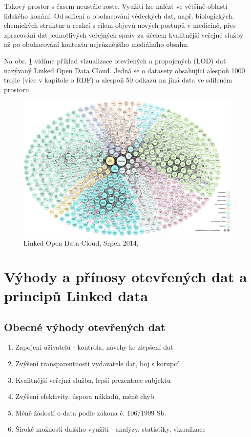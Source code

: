 Takový prostor s časem neustále roste. Využití lze nalézt ve většině oblastí lidského konání. Od sdílení a obohacování vědeckých dat, např. biologických, chemických struktur a reakcí s cílem objevů nových postupů v medicíně, přes zpracování dat jednotlivých veřejných správ za účelem kvalitnější veřejné služby až po obohacování kontextu nejrůznějšího mediálního obsahu. 

Na obr. \ref{obr:lodcloud} vidíme příklad vizualizace otevřených a propojených (LOD) dat nazývaný Linked Open Data Cloud. Jedná se o datasety obsahující alespoň 1000 trojic (více v kapitole o RDF) a alespoň 50 odkazů na jiná data ve sdíleném prostoru. 

\newpage

\begin{figure}[h]
\centerline{\includegraphics[width=\textwidth]{img/lodcloud.eps}}
\caption[Linked Open Data Cloud]{Linked Open Data Cloud, Srpen 2014, \cite{cloud}}
\label{obr:lodcloud}
\end{figure}

\section{Výhody a přínosy otevřených dat a principů Linked data}

\subsection*{Obecné výhody otevřených dat\cite{benefitsgovernment,howtoopendata}}

\begin{enumerate}
\item Zapojení uživatelů - kontrola, návrhy ke zlepšení dat   
\item Zvýšení transparentnosti vydavatele dat, boj s korupcí
\item Kvalitnější veřejná služba, lepší prezentace subjektu
\item Zvýšení efektivity, úspora nákladů, méně chyb
\item Méně žádostí o data podle zákona č. 106/1999 Sb.\cite{z106} 
\item Široké možnosti dalšího využití - analýzy, statistiky, vizualizace
\end{enumerate}


